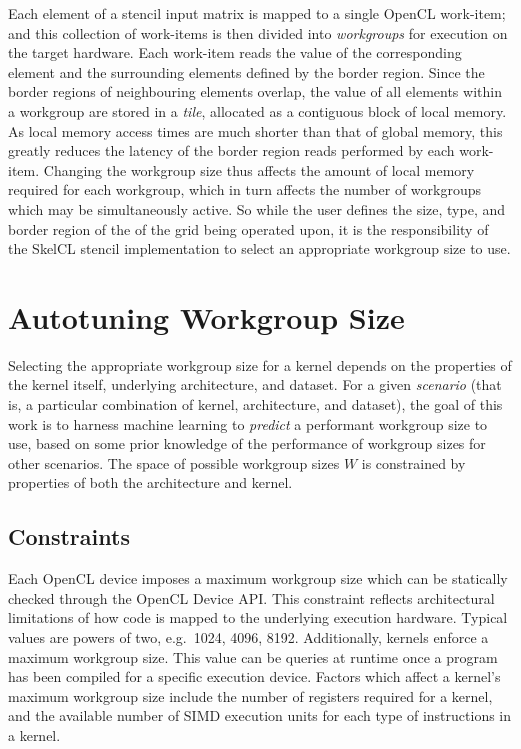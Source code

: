 \documentclass[nonatbib,preprint,10pt]{sigplanconf}
\begin{document}
Each element of a stencil input matrix is mapped to a single OpenCL
work-item; and this collection of work-items is then divided into
\emph{workgroups} for execution on the target hardware. Each work-item
reads the value of the corresponding element and the surrounding
elements defined by the border region. Since the border regions of
neighbouring elements overlap, the value of all elements within a
workgroup are stored in a \emph{tile}, allocated as a contiguous block
of local memory. As local memory access times are much shorter than
that of global memory, this greatly reduces the latency of the border
region reads performed by each work-item. Changing the workgroup size
thus affects the amount of local memory required for each workgroup,
which in turn affects the number of workgroups which may be
simultaneously active. So while the user defines the size, type, and
border region of the of the grid being operated upon, it is the
responsibility of the SkelCL stencil implementation to select an
appropriate workgroup size to use.


\section{Autotuning Workgroup Size}

Selecting the appropriate workgroup size for a kernel depends on the
properties of the kernel itself, underlying architecture, and
dataset. For a given \emph{scenario} (that is, a particular
combination of kernel, architecture, and dataset), the goal of this
work is to harness machine learning to \emph{predict} a performant
workgroup size to use, based on some prior knowledge of the
performance of workgroup sizes for other scenarios. The space of
possible workgroup sizes $W$ is constrained by properties of both the
architecture and kernel.

\subsection{Constraints}

Each OpenCL device imposes a maximum workgroup size which can be
statically checked through the OpenCL Device API. This constraint
reflects architectural limitations of how code is mapped to the
underlying execution hardware. Typical values are powers of two, e.g.\
1024, 4096, 8192. Additionally, kernels enforce a maximum workgroup
size. This value can be queries at runtime once a program has been
compiled for a specific execution device. Factors which affect a
kernel's maximum workgroup size include the number of registers
required for a kernel, and the available number of SIMD execution
units for each type of instructions in a kernel.
\end{document}
